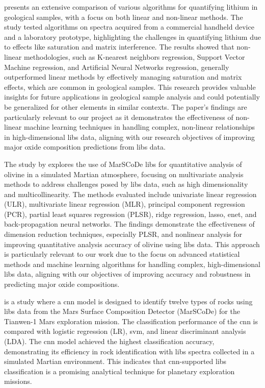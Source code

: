 \citet{ferreiraComprehensiveComparisonLinear2022} presents an extensive comparison of various algorithms for quantifying lithium in geological samples, with a focus on both linear and non-linear methods.
The study tested algorithms on spectra acquired from a commercial handheld device and a laboratory prototype, highlighting the challenges in quantifying lithium due to effects like saturation and matrix interference.
The results showed that non-linear methodologies, such as K-nearest neighbors regression, Support Vector Machine regression, and Artificial Neural Networks regression, generally outperformed linear methods by effectively managing saturation and matrix effects, which are common in geological samples.
This research provides valuable insights for future applications in geological sample analysis and could potentially be generalized for other elements in similar contexts.
The paper's findings are particularly relevant to our project as it demonstrates the effectiveness of non-linear machine learning techniques in handling complex, non-linear relationships in high-dimensional \gls{libs} data, aligning with our research objectives of improving major oxide composition predictions from \gls{libs} data.

The study by \citet{liuComparisonQuantitativeAnalysis2022} explores the use of MarSCoDe \gls{libs} for quantitative analysis of olivine in a simulated Martian atmosphere, focusing on multivariate analysis methods to address challenges posed by \gls{libs} data, such as high dimensionality and multicollinearity.
The methods evaluated include univariate linear regression (ULR), multivariate linear regression (MLR), principal component regression (PCR), partial least squares regression (PLSR), ridge regression, \gls{lasso}, \gls{enet}, and back-propagation neural networks.
The findings demonstrate the effectiveness of dimension reduction techniques, especially PLSR, and nonlinear analysis for improving quantitative analysis accuracy of olivine using \gls{libs} data.
This approach is particularly relevant to our work due to the focus on advanced statistical methods and machine learning algorithms for handling complex, high-dimensional \gls{libs} data, aligning with our objectives of improving accuracy and robustness in predicting major oxide compositions.

\cite{yangConvolutionalNeuralNetwork2022} is a study where a \gls{cnn} model is designed to identify twelve types of rocks using \gls{libs} data from the Mars Surface Composition Detector (MarSCoDe) for the Tianwen-1 Mars exploration mission.
The classification performance of the \gls{cnn} is compared with logistic regression (LR), \gls{svm}, and linear discriminant analysis (LDA).
The \gls{cnn} model achieved the highest classification accuracy, demonstrating its efficiency in rock identification with \gls{libs} spectra collected in a simulated Martian environment.
This indicates that \gls{cnn}-supported \gls{libs} classification is a promising analytical technique for planetary exploration missions.

